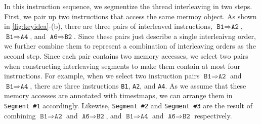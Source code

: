 In this instruction sequence, we segmentize the thread interleaving in
two steps. First, we pair up two instructions that access the same
mermoy object.
%
As shown in \autoref{fig:keyidea}-(b), there are three pairs of
interleaved instructions, $\texttt{B1} \Rightarrow \texttt{A2}$,
$\texttt{B1} \Rightarrow \texttt{A4}$, and
$\texttt{A6} \Rightarrow \texttt{B2}$.
%
Since these pairs just describe a single interleaivng order, we
further combine them to represent a combination of interleaving orders
as the second step.
%
Since each pair contains two memory accesses, we select two pairs when
constructing interleaving segments to make them contain at most four
instructions.
%
For example, when we select two instruction pairs
$\texttt{B1} \Rightarrow \texttt{A2}$ and
$\texttt{B1} \Rightarrow \texttt{A4}$, there are three instructions
\texttt{B1}, \texttt{A2}, and \texttt{A4}.
%
As we assume that these memory accesses are annotated with timestmaps,
we can arrange them in \texttt{Segment \#1} accordingly.
%
Likewise, \texttt{Segment \#2} and \texttt{Segment \#3} are the result
of combining $\texttt{B1} \Rightarrow \texttt{A2}$ and
$\texttt{A6} \Rightarrow \texttt{B2}$, and
$\texttt{B1} \Rightarrow \texttt{A4}$ and
$\texttt{A6} \Rightarrow \texttt{B2}$ respectively.

%
%



